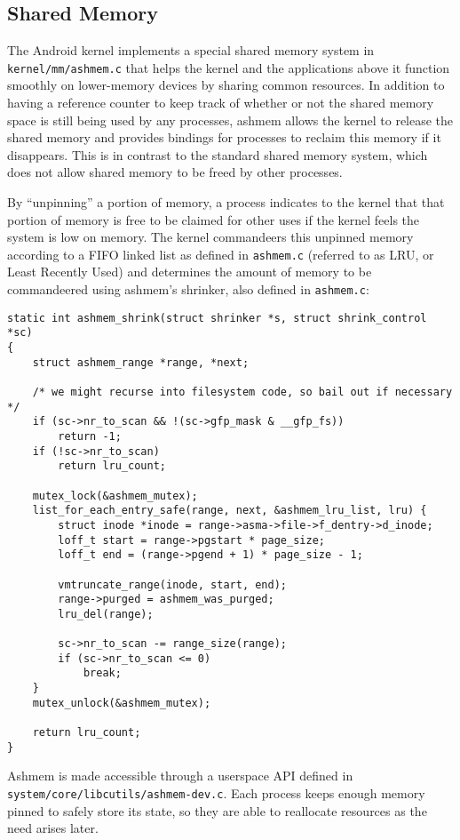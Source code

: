 \documentclass[12pt,letterpaper]{article}
\begin{document}
\subsection*{Shared Memory}

The Android kernel implements a special shared memory system in
\verb|kernel/mm/ashmem.c| that helps the kernel and the applications above it
function smoothly on lower-memory devices by sharing common resources. In
addition to having a reference counter to keep track of whether or not the
shared memory space is still being used by any processes, ashmem allows the
kernel to release the shared memory and provides bindings for processes to
reclaim this memory if it disappears. This is in contrast to the standard
shared memory system, which does not allow shared memory to be freed by other
processes.

By ``unpinning'' a portion of memory, a process indicates to the kernel that
that portion of memory is free to be claimed for other uses if the kernel feels
the system is low on memory. The kernel commandeers this unpinned memory
according to a FIFO linked list as defined in \verb|ashmem.c| (referred to as
LRU, or Least Recently Used) and determines the amount of memory to be
commandeered using ashmem's shrinker, also defined in \verb|ashmem.c|:

{\small
\begin{verbatim}
static int ashmem_shrink(struct shrinker *s, struct shrink_control *sc)
{
    struct ashmem_range *range, *next;

    /* we might recurse into filesystem code, so bail out if necessary */
    if (sc->nr_to_scan && !(sc->gfp_mask & __gfp_fs))
        return -1;
    if (!sc->nr_to_scan)
        return lru_count;

    mutex_lock(&ashmem_mutex);
    list_for_each_entry_safe(range, next, &ashmem_lru_list, lru) {
        struct inode *inode = range->asma->file->f_dentry->d_inode;
        loff_t start = range->pgstart * page_size;
        loff_t end = (range->pgend + 1) * page_size - 1;

        vmtruncate_range(inode, start, end);
        range->purged = ashmem_was_purged;
        lru_del(range);

        sc->nr_to_scan -= range_size(range);
        if (sc->nr_to_scan <= 0)
            break;
    }
    mutex_unlock(&ashmem_mutex);

    return lru_count;
}
\end{verbatim}
}

Ashmem is made accessible through a userspace API defined in \\
\verb|system/core/libcutils/ashmem-dev.c|. Each process keeps enough memory
pinned to safely store its state, so they are able to reallocate resources as
the need arises later.
\end{document}
